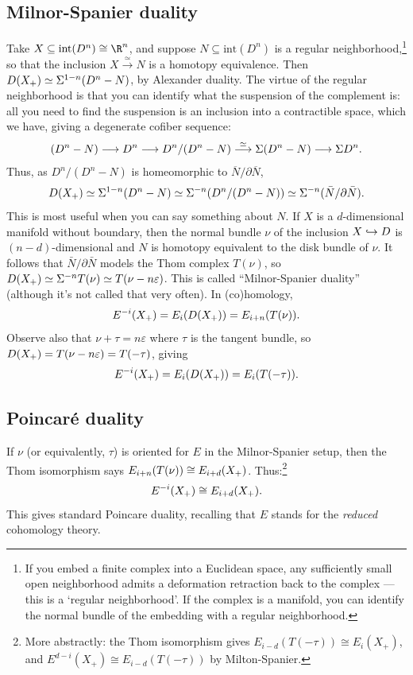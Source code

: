 \subsection*{Milnor-Spanier duality}
Take $X \subseteq \mathrm{int}(D^n) \cong \R^n$, and suppose $N \subseteq \mathrm{int}(D^n)$ is a regular neighborhood,\footnote{If you embed a finite complex into a Euclidean space, any sufficiently small
open neighborhood admits a deformation retraction back to the complex
 --- this is a `regular neighborhood'. If the complex is a manifold,
you can identify the normal bundle of the embedding with a regular
neighborhood. } so that the inclusion $X \stackrel{\simeq}{\to} N$ is a homotopy equivalence.  Then $D(X_+) \simeq \Sigma^{1-n}(D^n - N)$, by Alexander duality.
The virtue of the regular neighborhood is that you can identify what the suspension of the complement is: all you need to find the suspension is an inclusion into a contractible space, which we have, giving a degenerate cofiber sequence:
\[(D^n - N) \longrightarrow D^n \longrightarrow D^n/(D^n - N) \overset{\simeq}{\longrightarrow} \Sigma(D^n - N)\longrightarrow\Sigma D^n.\]
Thus, as $D^n/(D^n-N)$ is homeomorphic to $\overline N/\partial\overline N$,
\[D(X_+)\simeq\Sigma^{1-n}(D^n - N) \simeq \Sigma^{-n}(D^n / (D^n-N)) \simeq \Sigma^{-n}(\bar N / \partial \bar N).\]
This is most useful when you can say something about $N$.  If $X$ is a $d$-dimensional manifold without boundary, then the normal bundle $\nu$ of the inclusion $X \hookrightarrow D$ is $(n-d)$-dimensional and $N$ is homotopy equivalent to the disk bundle of $\nu$.  It follows that $\bar N / \partial \bar N$ models the Thom complex $T (\nu)$, so $D(X_+) \simeq \Sigma^{-n} T(\nu) \simeq T(\nu - n \varepsilon)$.  This is called ``Milnor-Spanier duality'' (although it's not called that very often).  In (co)homology,
\[
E^{-i}(X_+) = E_i (D(X_+)) = E_{i+n} (T (\nu)).
\]
Observe also that $\nu + \tau = n \varepsilon$ where $\tau$ is the tangent bundle, so $D(X_+) = T(\nu - n \varepsilon) = T(-\tau)$, giving
\[
E^{-i}(X_+) = E_i (D(X_+)) = E_{i} (T (-\tau)).
\]
\subsection*{Poincar\'e duality}
If $\nu$ (or equivalently, $\tau$) is oriented for $E$ in the Milnor-Spanier setup, then the Thom isomorphism says $E_{i+n} (T (\nu)) \cong E_{i+d} (X_+)$. Thus:\footnote{More abstractly: the Thom isomorphism gives $E_{i-d}(T(-\tau))\cong E_i(X_+)$, and $E^{d-i}(X_+)\cong E_{i-d}(T(-\tau))$ by Milton-Spanier.}
\[E^{-i} (X_+) \cong E_{i+d} (X_+).\]
This gives standard Poincare duality, recalling that $E$ stands for the \emph{reduced} cohomology theory.


